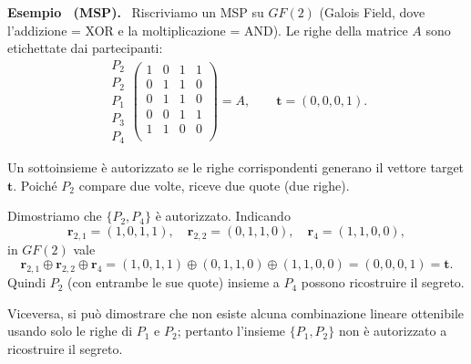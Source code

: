 \documentclass[a4paper, 11pt]{article}
\newenvironment{example}[1][]{
  \par\noindent\textbf{Esempio%
  \if\relax\detokenize{#1}\relax\else\ (\textbf{#1})\fi.}\ }{}
\begin{document}
\begin{example}[MSP]
Riscriviamo un MSP su $GF(2)$ (Galois Field, dove l'addizione = XOR e la moltiplicazione = AND). Le righe della matrice $A$ sono etichettate dai partecipanti:
\[
\begin{array}{c}
P_2\\ P_2\\ P_1\\ P_3\\ P_4
\end{array}
\left(
\begin{array}{cccc}
1 & 0 & 1 & 1\\
0 & 1 & 1 & 0\\
0 & 1 & 1 & 0\\
0 & 0 & 1 & 1\\
1 & 1 & 0 & 0\\
\end{array}
\right)
= A,
\qquad
\mathbf{t}=(0,0,0,1).
\]

Un sottoinsieme è autorizzato se le righe corrispondenti generano il vettore target $\mathbf{t}$. Poiché $P_2$ compare due volte, riceve due quote (due righe).

Dimostriamo che $\{P_2, P_4\}$ è autorizzato. Indicando
\[
\mathbf{r}_{2,1}=(1,0,1,1),\quad
\mathbf{r}_{2,2}=(0,1,1,0),\quad
\mathbf{r}_{4}=(1,1,0,0),
\]
in $GF(2)$ vale
\[
\mathbf{r}_{2,1}\oplus \mathbf{r}_{2,2}\oplus \mathbf{r}_{4}
=(1,0,1,1)\oplus(0,1,1,0)\oplus(1,1,0,0)
=(0,0,0,1)=\mathbf{t}.
\]
Quindi $P_2$ (con entrambe le sue quote) insieme a $P_4$ possono ricostruire il segreto.

Viceversa, si può dimostrare che non esiste alcuna combinazione lineare ottenibile usando solo le righe di $P_1$ e $P_2$; pertanto l'insieme $\{P_1,P_2\}$ non è autorizzato a ricostruire il segreto.
\end{example}
\end{document}
